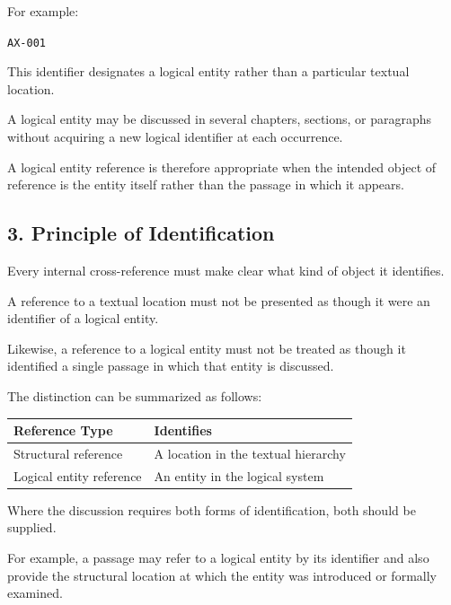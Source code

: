 For example:

\begin{center}
    \texttt{AX-001}
\end{center}

This identifier designates a logical entity rather
than a particular textual location.

A logical entity may be discussed in several chapters,
sections, or paragraphs without acquiring a new
logical identifier at each occurrence.

A logical entity reference is therefore appropriate
when the intended object of reference is the entity
itself rather than the passage in which it appears.


\subsection*{3. Principle of Identification}

Every internal cross-reference must make clear
what kind of object it identifies.

A reference to a textual location must not be
presented as though it were an identifier of
a logical entity.

Likewise, a reference to a logical entity must
not be treated as though it identified a single
passage in which that entity is discussed.

The distinction can be summarized as follows:

\begin{center}
\begin{tabular}{ll}
    \toprule
    \textbf{Reference Type} & \textbf{Identifies} \\
    \midrule
    Structural reference
        & A location in the textual hierarchy \\
    Logical entity reference
        & An entity in the logical system \\
    \bottomrule
\end{tabular}
\end{center}

Where the discussion requires both forms of
identification, both should be supplied.

For example, a passage may refer to a logical
entity by its identifier and also provide the
structural location at which the entity was
introduced or formally examined.

